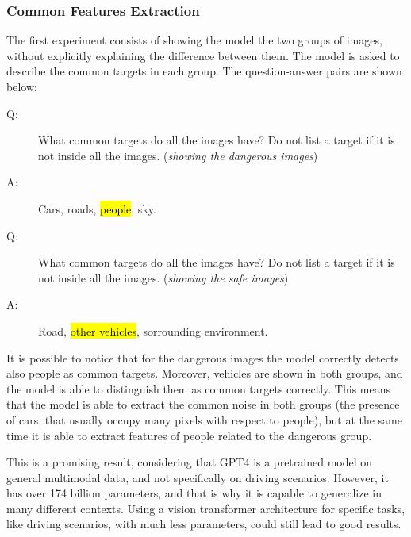 \subsubsection{Common Features Extraction}
The first experiment consists of showing the model the two groups of images, 
without explicitly explaining the difference between them. The model is asked 
to describe the common targets in each group. The question-answer pairs are 
shown below:
%
{\selectfont
\begin{description}
    \item[Q:] What common targets do all the images have?
    Do not list a target if it is not inside all the images. 
    (\emph{showing the dangerous images})
    \item[A:] Cars, roads, \hl{people}, sky.
    \item[Q:] What common targets do all the images have?
    Do not list a target if it is not inside all the images. 
    (\emph{showing the safe images})
    \item[A:] Road, \hl{other vehicles}, sorrounding environment.    
\end{description}
}
It is possible to notice that for the dangerous images the model correctly 
detects also people as common targets. Moreover, vehicles are shown in both 
groups, and the model is able to distinguish them as common targets correctly.
This means that the model is able to extract the common noise in both groups 
(the presence of cars, that usually occupy many pixels with respect to people), 
but at the same time it is able to extract features of people related to the 
dangerous group.

This is a promising result, considering that GPT4 is a pretrained model on 
general multimodal data, and not specifically on driving scenarios. 
However, it has over 174 billion parameters, and that is why it is capable to 
generalize in many different contexts. Using a vision transformer architecture 
for specific tasks, like driving scenarios, with much less parameters, could 
still lead to good results.
